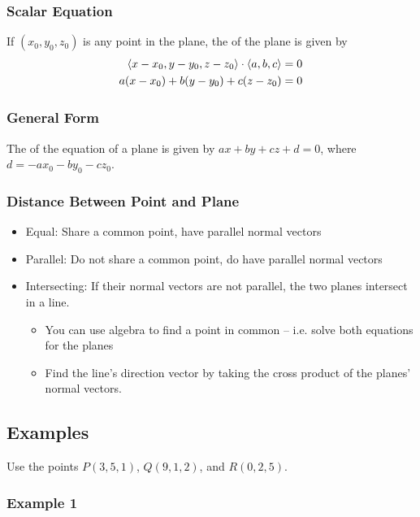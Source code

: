 \subsubsection{Scalar Equation}

If \((x_{0},y_{0},z_{0})\) is any point in the plane, the  of the plane is given by
\begin{align*}
    \left\langle x - x_{0}, y - y_{0}, z - z_{0} \right\rangle \cdot \left\langle a,b,c \right\rangle &= 0 \\
    a(x - x_{0}) + b(y - y_{0}) + c(z - z_{0}) &= 0
\end{align*}

\subsubsection{General Form}

The  of the equation of a plane is given by \(ax + by + cz + d = 0\), where \(d = -ax_{0} - by_{0} - cz_{0}\).

\subsubsection{Distance Between Point and Plane}

\begin{itemize}
    \item Equal: Share a common point, have parallel normal vectors
    \item Parallel: Do not share a common point, do have parallel normal vectors
    \item Intersecting: If their normal vectors are not parallel, the two planes intersect in a line.
    \begin{itemize}
        \item You can use algebra to find a point in common -- i.e. solve both equations for the planes
        \item Find the line's direction vector by taking the cross product of the planes' normal vectors.
    \end{itemize}
\end{itemize}

\subsection{Examples}

Use the points \(P(3,5,1)\), \(Q(9,1,2)\), and \(R(0,2,5)\).

\subsubsection{Example 1}

